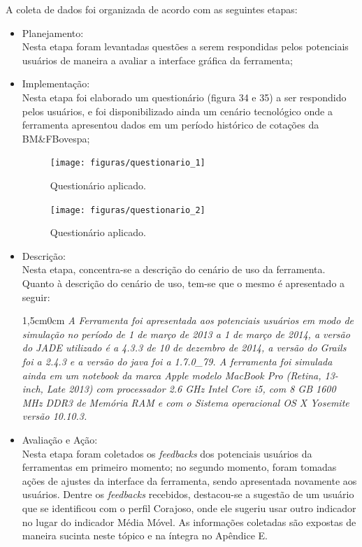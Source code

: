 A coleta de dados foi organizada de acordo com as seguintes etapas: 
\begin{itemize}
\item Planejamento:\\
Nesta etapa foram levantadas questões a serem respondidas pelos potenciais usuários de maneira a avaliar a interface gráfica da ferramenta;

\item Implementação:\\
Nesta etapa foi elaborado um questionário (figura 34 e 35) a ser respondido pelos usuários, e foi disponibilizado ainda um cenário tecnológico onde a ferramenta apresentou dados em um período histórico de cotações da BM\&FBovespa;

\begin{figure}[h]
\centering
\label{f34}
\texttt{[image: figuras/questionario\_1]}
\caption{Questionário aplicado.}
\end{figure}

\begin{figure}[h]
\centering
\label{f34}
\texttt{[image: figuras/questionario\_2]}
\caption{Questionário aplicado.}
\end{figure}
\FloatBarrier

\item Descrição:\\
Nesta etapa, concentra-se a descrição do cenário de uso da ferramenta. Quanto à descrição do cenário de uso, tem-se que o mesmo é apresentado a seguir:

\begin{adjustwidth}{1,5cm}{0cm}
 \textit{A Ferramenta foi apresentada aos potenciais usuários em modo de simulação no período de 1 de março de 2013 a 1 de março de 2014, a versão do JADE utilizado é a 4.3.3 de 10 de dezembro de 2014, a versão do Grails foi a 2.4.3 e a versão do java foi a 1.7.0\_79. A ferramenta foi simulada ainda em um notebook da marca Apple modelo MacBook Pro (Retina, 13-inch, Late 2013) com processador 2.6 GHz Intel Core i5, com 8 GB 1600 MHz DDR3 de Memória RAM e com o Sistema operacional OS X Yosemite versão 10.10.3.} 
\end{adjustwidth}

\item Avaliação e Ação:\\
Nesta etapa foram coletados os \textit{feedbacks} dos potenciais usuários da ferramentas em primeiro momento; no segundo momento, foram tomadas ações de ajustes da interface da ferramenta, sendo apresentada novamente aos usuários. Dentre os \textit{feedbacks} recebidos, destacou-se a sugestão de um usuário que se identificou com o perfil Corajoso, onde ele sugeriu usar outro indicador no lugar do indicador Média Móvel. As informações coletadas são expostas de maneira sucinta neste tópico e na íntegra no Apêndice E.
\end{itemize}
